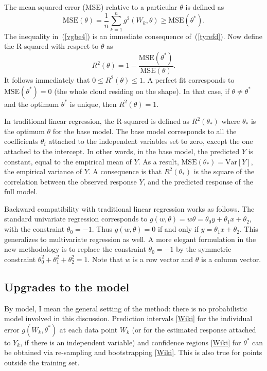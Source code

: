 \documentclass[oneside,10pt]{book}
\begin{document}
\noindent The \textcolor{index}{mean squared error} (MSE) relative to a particular $\theta$ is defined as
\begin{equation}
\text{MSE}(\theta)=\frac{1}{n}\sum_{k=1}^n g^2(W_k,\theta) \geq \text{MSE}(\theta^*). \label{vgbe4}
\end{equation}
The inequality in~(\ref{vgbe4})  is an immediate consequence of~(\ref{tyrefd}). Now define the
 \textcolor{index}{R-squared}
 with respect to
 $\theta$ as
\begin{equation}
R^2(\theta)=1 - \frac{\text{MSE}(\theta^*)}{\text{MSE}(\theta)}. \label{rsqwa}
\end{equation}
It follows immediately that $0\leq R^2(\theta)\leq 1$. A perfect fit corresponds to $\text{MSE}(\theta^*)=0$ (the whole cloud residing on the shape). In that case,  if $\theta\neq \theta^*$ and the optimum $\theta^*$ is unique, then $R^2(\theta)=1$.

In traditional linear regression, the R-squared is defined as $R^2(\theta_*)$ where $\theta_*$ is the optimum $\theta$ for the base model.
The base model corresponds to all the coefficients $\theta_i$ attached to the independent variables set to zero, except the one attached to the intercept. In other words, in the base model, the predicted $Y$ is constant, equal to the empirical mean of $Y$. As a result,  $\text{MSE}(\theta_*)=\text{Var}[Y]$, the empirical variance of $Y$. A consequence is that $R^2(\theta_*)$ is the square of the
 correlation between the observed response $Y$, and the predicted response of the full model.


Backward compatibility with traditional linear regression works as follows. The standard univariate regression corresponds to
$g(w,\theta) = w \theta =\theta_0 y +\theta_1 x + \theta_2$, with the constraint $\theta_0=-1$.  Thus $g(w,\theta)=0$ if and only if
 $y= \theta_1 x + \theta_2$. This generalizes to multivariate regression as well.
A more elegant formulation in the new methodology is to replace the constraint $\theta_0=-1$ by the symmetric constraint $\theta_0^2+\theta_1^2+\theta_2^2=1$.
 Note that $w$ is a row vector and $\theta$ is a column vector.

\subsection{Upgrades to the model}

By model, I mean the general setting of the method: there is no probabilistic model involved in this discussion.
\textcolor{index}{Prediction intervals} [\href{https://en.wikipedia.org/wiki/Prediction_interval}{Wiki}] for the individual error $g(W_k,\theta^*)$ at each data point $W_k$ (or for the estimated response attached to $Y_k$, if there is an independent variable) and
 \textcolor{index}{confidence regions} [\href{https://en.wikipedia.org/wiki/Confidence_region}{Wiki}] for $\theta^*$ can be obtained via re-sampling and \textcolor{index}{bootstrapping} [\href{https://en.wikipedia.org/wiki/Bootstrapping_(statistics)}{Wiki}]. This is also true for points outside the training set.
\end{document}
